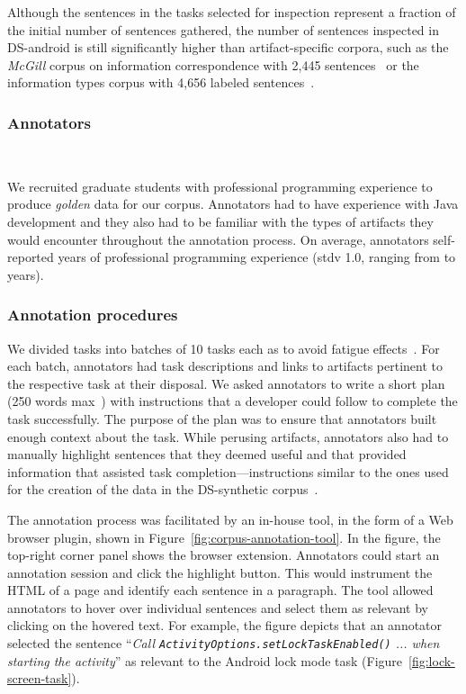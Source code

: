 Although the sentences in the tasks selected for inspection represent
a fraction of the initial number of sentences gathered, 
the number of sentences inspected in \acs{DS-android}
is still significantly higher than 
artifact-specific corpora, such as the \textit{McGill} corpus on information correspondence with 2,445 sentences~\cite{arya2020} or the information types corpus with 4,656 labeled sentences~\cite{Arya2019}.


\subsubsection{Annotators}
\textcolor{white}{force ident} %

We recruited  graduate students with professional programming experience to produce \textit{golden} data for our corpus. Annotators had to have experience with Java development and they also had to be familiar with the types of artifacts they would encounter throughout the annotation process. 
On average, annotators self-reported  years of professional
programming experience (stdv 1.0, ranging from  to  years).



\subsubsection{Annotation procedures}



We divided tasks into batches of 10 tasks each as to avoid fatigue effects~\cite{Ponzanelli2017}. For each batch, annotators had task descriptions and links to artifacts pertinent to the respective task at their disposal. We asked annotators to write a short plan (250 words max~\cite{Rastkar2010}) with instructions that a developer could follow to complete the task successfully. 
The purpose of the plan was to ensure that annotators built enough context about the task.
While perusing artifacts, annotators also had to manually highlight sentences that they deemed useful and that provided information that assisted task completion---instructions similar to the ones used for the creation of the data in the \acs{DS-synthetic} corpus~\cite{marques2020}.


The annotation process was facilitated by an in-house tool, in the form of a Web browser plugin, shown in Figure~\ref{fig:corpus-annotation-tool}. In the figure, the top-right corner panel shows the browser extension. Annotators could start an annotation session and click the highlight button.
This would instrument the HTML of a page and identify each sentence in a paragraph. The tool allowed annotators to hover over individual sentences and select them as relevant by clicking on the hovered text. For example, the figure depicts that an annotator selected  the sentence
``\textit{Call {\small \texttt{ActivityOptions.setLockTaskEnabled()}} ... when starting the activity}'' as relevant to the Android lock mode task (Figure~\ref{fig:lock-screen-task}).







